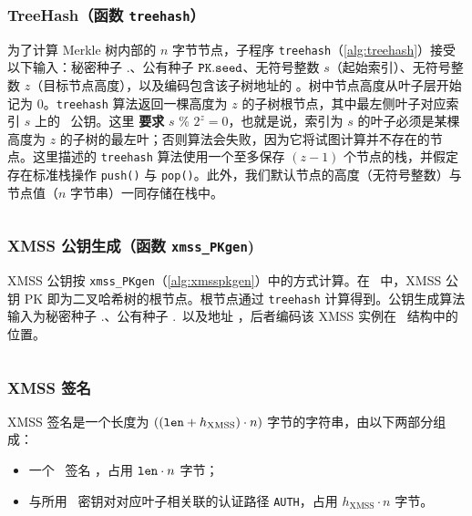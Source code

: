 \subsubsection{TreeHash（函数 \texttt{treehash}）}

为了计算 Merkle 树内部的 $n$ 字节节点，子程序 \texttt{treehash}（\cref{alg:treehash}）接受以下输入：秘密种子 \sk.\seed、公有种子 $\pk.\seed$、无符号整数 $s$（起始索引）、无符号整数 $z$（目标节点高度），以及编码包含该子树地址的 \ADRS。树中节点高度从叶子层开始记为 0。\texttt{treehash} 算法返回一棵高度为 $z$ 的子树根节点，其中最左侧叶子对应索引 $s$ 上的 \WOTSCS\ 公钥。这里 \textbf{要求} $s$ \% $2^{z}=0$，也就是说，索引为 $s$ 的叶子必须是某棵高度为 $z$ 的子树的最左叶；否则算法会失败，因为它将试图计算并不存在的节点。这里描述的 \texttt{treehash} 算法使用一个至多保存 $(z-1)$ 个节点的栈，并假定存在标准栈操作 \texttt{push()} 与 \texttt{pop()}。此外，我们默认节点的高度（无符号整数）与节点值（$n$ 字节串）一同存储在栈中。

\begin{algorithm}
\inputminted[breaklines,linenos,tabsize=2,mathescape,escapeinside=||]{C}{paper/code/treehash.cs}
\caption{\texttt{treehash} --- TreeHash 算法。}
\label{alg:treehash}
\end{algorithm}

\subsubsection{XMSS 公钥生成（函数 \texttt{xmss\_PKgen})}

XMSS 公钥按 \texttt{xmss\_PKgen}（\cref{alg:xmsspkgen}）中的方式计算。在 \SPHINCSA\ 中，XMSS 公钥 PK 即为二叉哈希树的根节点。根节点通过 \texttt{treehash} 计算得到。公钥生成算法输入为秘密种子 \sk.\seed、公有种子 \pk.\seed\ 以及地址 \ADRS，后者编码该 XMSS 实例在 \SPHINCSA\ 结构中的位置。

\begin{algorithm}
    \inputminted[breaklines,linenos,tabsize=2,mathescape,escapeinside=||]{C}{paper/code/xmss_PKgen.cs}
    \caption{\texttt{xmss\_PKgen} --- 生成 XMSS 公钥。}
    \label{alg:xmsspkgen}
\end{algorithm}

\subsubsection{XMSS 签名}

XMSS 签名是一个长度为 $((\mathtt{len}+h_{\mathrm{XMSS}})\cdot n)$ 字节的字符串，由以下两部分组成：
\begin{itemize}
    \item 一个 \WOTSCS\ 签名 \sigots，占用 $\mathtt{len}\cdot n$ 字节；

    \item 与所用 \WOTSCS\ 密钥对对应叶子相关联的认证路径 \texttt{AUTH}，占用 $h_{\mathrm{XMSS}}\cdot n$ 字节。
\end{itemize}

